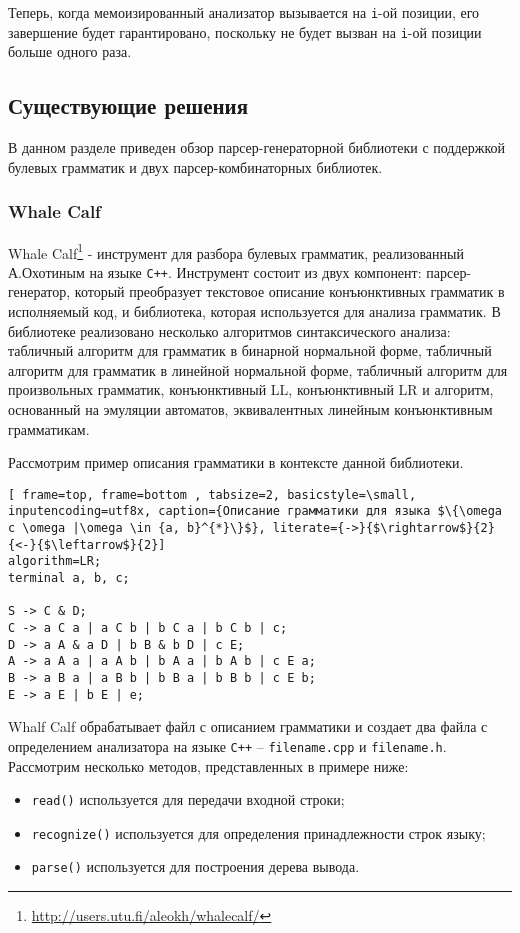 Теперь, когда мемоизированный анализатор вызывается на {\tt i}-ой позиции, его завершение будет гарантировано, поскольку не будет вызван на {\tt i}-ой позиции больше одного раза.
    
\subsection{Существующие решения}
В данном разделе приведен обзор парсер-генераторной библиотеки с поддержкой булевых грамматик и двух парсер-комбинаторных библиотек.
\subsubsection{Whale Calf}

Whale Calf\footnote{\url{http://users.utu.fi/aleokh/whalecalf/}} - инструмент для разбора булевых грамматик, реализованный А.Охотиным на языке {\tt C++}. Инструмент состоит из двух компонент: парсер-генератор, который преобразует текстовое описание конъюнктивных грамматик в исполняемый код, и библиотека, которая используется для анализа грамматик. В библиотеке реализовано несколько алгоритмов синтаксического анализа: табличный алгоритм для грамматик в бинарной нормальной форме, табличный алгоритм для грамматик в линейной нормальной форме, табличный алгоритм для произвольных грамматик, конъюнктивный LL, конъюнктивный LR и алгоритм, основанный на эмуляции автоматов, эквивалентных линейным конъюнктивным грамматикам. 

Рассмотрим пример описания грамматики в контексте данной библиотеки.
\begin{lstlisting}[ frame=top, frame=bottom , tabsize=2, basicstyle=\small, inputencoding=utf8x, caption={Описание грамматики для языка $\{\omega c \omega |\omega \in {a, b}^{*}\}$}, literate={->}{$\rightarrow$}{2} {<-}{$\leftarrow$}{2}]
algorithm=LR;
terminal a, b, c;

S -> C & D;
C -> a C a | a C b | b C a | b C b | c;
D -> a A & a D | b B & b D | c E;
A -> a A a | a A b | b A a | b A b | c E a;
B -> a B a | a B b | b B a | b B b | c E b;
E -> a E | b E | e;
\end{lstlisting}

Whalf Calf обрабатывает файл с описанием грамматики и создает два файла с определением анализатора на языке {\tt C++} -- {\tt filename.cpp} и {\tt filename.h}. Рассмотрим несколько методов, представленных в примере ниже:
\begin{itemize}
    \item {\tt read()} используется для передачи входной строки;
    \item {\tt recognize()} используется для определения принадлежности строк языку;
    \item {\tt parse()} используется для построения дерева вывода.
     
\end{itemize}


